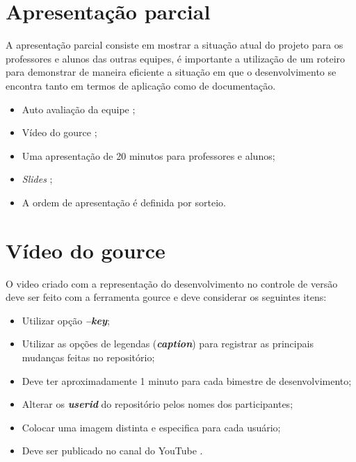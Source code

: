 \section{Apresentação parcial}\label{atv-apresentacao-parcial}
A apresentação parcial consiste em mostrar a situação atual do projeto para os professores e alunos das outras equipes, é importante a utilização de um roteiro para demonstrar de maneira eficiente a situação em que o desenvolvimento se encontra tanto em termos de aplicação como de documentação.

\begin{itemize}

    \item Auto avaliação da equipe ;
    
    \item Vídeo do \gls{gource} ;
    
    \item Uma apresentação de 20 minutos para professores e alunos;

    \item \emph{Slides} ;

    \item A ordem de apresentação é definida por sorteio.
    
\end{itemize}





\section{Vídeo do gource}\label{atv-video-gource}
O video criado com a representação do desenvolvimento no controle de versão deve ser feito com a ferramenta \gls{gource} e deve considerar os seguintes itens:

\begin{itemize}
    \item Utilizar opção \textbf{\emph{--key}};
    
    \item Utilizar as opções de legendas (\textbf{\emph{caption}}) para registrar as principais mudanças feitas no repositório;
    
    \item Deve ter aproximadamente 1 minuto para cada bimestre de desenvolvimento;
    
    \item Alterar os \textbf{\emph{userid}} do repositório pelos nomes dos participantes;
    
    \item Colocar uma imagem distinta e especifica para cada usuário;
    
    \item Deve ser publicado no canal do YouTube .
\end{itemize}

